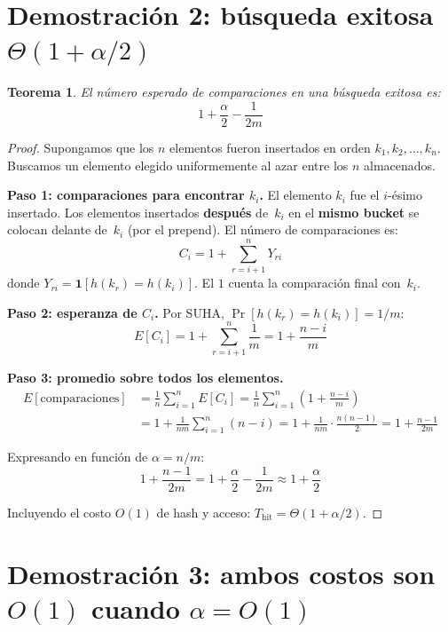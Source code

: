 \documentclass[11pt, letterpaper]{article}
\theoremstyle{definition}
\theoremstyle{plain}
\newtheorem{theorem}{Teorema}[section]
\theoremstyle{remark}
\begin{document}
\section{Demostración 2: búsqueda exitosa
  \texorpdfstring{$\Theta(1 + \alpha/2)$}{Theta(1 + alpha/2)}}

\begin{theorem}\label{thm:hit}
El número esperado de comparaciones en una búsqueda exitosa es:
\[
  1 + \frac{\alpha}{2} - \frac{1}{2m}
\]
\end{theorem}

\begin{proof}
Supongamos que los $n$ elementos fueron insertados en orden
$k_1, k_2, \ldots, k_n$. Buscamos un elemento elegido uniformemente
al azar entre los $n$ almacenados.

\textbf{Paso 1: comparaciones para encontrar $k_i$.} El elemento
$k_i$ fue el $i$-ésimo insertado. Los elementos insertados
\textbf{después} de~$k_i$ en el \textbf{mismo bucket} se colocan
delante de~$k_i$ (por el prepend). El número de comparaciones es:
\[
  C_i = 1 + \sum_{r=i+1}^{n} Y_{ri}
\]
donde $Y_{ri} = \mathbf{1}[h(k_r) = h(k_i)]$. El $1$ cuenta la
comparación final con~$k_i$.

\textbf{Paso 2: esperanza de $C_i$.} Por SUHA,
$\Pr[h(k_r) = h(k_i)] = 1/m$:
\[
  E[C_i] = 1 + \sum_{r=i+1}^{n} \frac{1}{m} = 1 + \frac{n - i}{m}
\]

\textbf{Paso 3: promedio sobre todos los elementos.}
\begin{align*}
  E[\text{comparaciones}]
  &= \frac{1}{n} \sum_{i=1}^{n} E[C_i]
   = \frac{1}{n} \sum_{i=1}^{n} \left(1 + \frac{n - i}{m}\right) \\
  &= 1 + \frac{1}{nm} \sum_{i=1}^{n} (n - i)
   = 1 + \frac{1}{nm} \cdot \frac{n(n{-}1)}{2}
   = 1 + \frac{n-1}{2m}
\end{align*}

Expresando en función de $\alpha = n/m$:
\[
  1 + \frac{n-1}{2m} = 1 + \frac{\alpha}{2} - \frac{1}{2m}
  \approx 1 + \frac{\alpha}{2}
\]

Incluyendo el costo $O(1)$ de hash y acceso:
$T_{\text{hit}} = \Theta(1 + \alpha/2)$.
\end{proof}

\section{Demostración 3: ambos costos son $O(1)$ cuando
  \texorpdfstring{$\alpha = O(1)$}{alpha = O(1)}}
\end{document}
